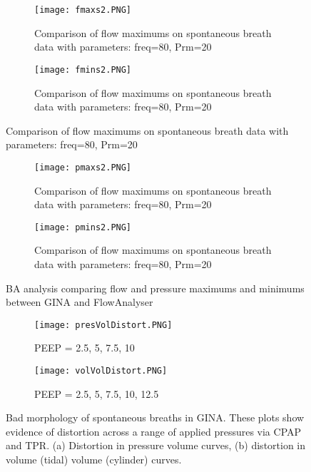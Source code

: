 \documentclass[12pt, openany, oneside]{book}
\begin{document}
\begin{figure}
\centering
	\begin{subfigure}[t]{0.99\textwidth}
		\centering
		\texttt{[image: fmaxs2.PNG]}		
		\caption{Comparison of flow maximums on spontaneous breath data with parameters: freq=80, Prm=20}
		\label{fig:baf2max}
	\end{subfigure}%
	\hfill
	\begin{subfigure}[t]{0.99\textwidth}
		\centering
		\texttt{[image: fmins2.PNG]}		
		\caption{Comparison of flow maximums on spontaneous breath data with parameters: freq=80, Prm=20}
		\label{fig:baf2min}
	\end{subfigure}
\end{figure}
\begin{figure}\ContinuedFloat
\centering
	\begin{subfigure}[t]{0.99\textwidth}
		\centering
		\texttt{[image: pmaxs2.PNG]}		
		\caption{Comparison of flow maximums on spontaneous breath data with parameters: freq=80, Prm=20}
		\label{fig:bap2max}
	\end{subfigure}%
	\hfill
	\hfill
	\begin{subfigure}[t]{0.99\textwidth}
		\centering
		\texttt{[image: pmins2.PNG]}		
		\caption{Comparison of flow maximums on spontaneous breath data with parameters: freq=80, Prm=20}
		\label{fig:bap2min}
	\end{subfigure}
	\caption{BA analysis comparing flow and pressure maximums and minimums between GINA and FlowAnalyser}
	\label{fig:bas}
\end{figure}




\begin{figure}
\centering
	\begin{subfigure}[t]{0.99\textwidth}
		\centering
		\texttt{[image: presVolDistort.PNG]}		
		\caption{PEEP = 2.5, 5, 7.5, 10}
		\label{fig:bad1}
	\end{subfigure}%
	\hfill
	\begin{subfigure}[t]{0.7\textwidth}
		\centering
		\texttt{[image: volVolDistort.PNG]}		
		\caption{PEEP = 2.5, 5, 7.5, 10, 12.5}
		\label{fig:bad2}
	\end{subfigure}
	
\caption[Bad morphology of spontaneous breaths in GINA]{Bad morphology of spontaneous breaths in GINA. These plots show evidence of distortion across a range of applied pressures via CPAP and TPR. (a) Distortion in pressure volume curves, (b) distortion in volume (tidal) volume (cylinder) curves.}

\label{fig:morph}

\end{figure}
\end{document}
